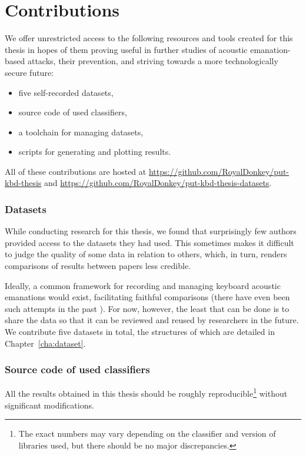 \documentclass[../main.tex]{subfiles}
\begin{document}
\section{Contributions}\label{sec:intro_contributions}
We offer unrestricted access to the following resources and tools created for this thesis in hopes of them proving useful in further studies of acoustic emanation-based attacks, their prevention, and striving towards a more technologically secure future:
\begin{multicols}{2}
\begin{itemize}
    \item five self-recorded datasets,
    \item source code of used classifiers,
    \item a toolchain for managing datasets,
    \item scripts for generating and plotting results.
\end{itemize}
\end{multicols}
\noindent
All of these contributions are hosted at \url{https://github.com/RoyalDonkey/put-kbd-thesis} and \url{https://github.com/RoyalDonkey/put-kbd-thesis-datasets}.

\subsubsection*{Datasets}
While conducting research for this thesis, we found that surprisingly few authors provided access to the datasets they had used. This sometimes makes it difficult to judge the quality of some data in relation to others, which, in turn, renders comparisons of results between papers less credible.

Ideally, a common framework for recording and managing keyboard acoustic emanations would exist, facilitating faithful comparisons (there have even been such attempts in the past \cite{wit2014all-conclusion}). For now, however, the least that can be done is to share the data so that it can be reviewed and reused by researchers in the future. We contribute five datasets in total, the structures of which are detailed in Chapter~\ref{cha:dataset}.

\subsubsection*{Source code of used classifiers}
All the results obtained in this thesis should be roughly reproducible\footnote{The exact numbers may vary depending on the classifier and version of libraries used, but there should be no major discrepancies.} without significant modifications.
\end{document}
